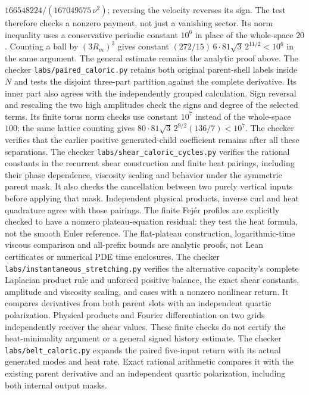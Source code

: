 \documentclass[11pt]{article}
\begin{document}
$166548224/(167049575\,\nu^2)$; reversing the velocity reverses its sign.
The test therefore checks a nonzero payment, not just a vanishing sector.
Its norm inequality uses a conservative periodic constant $10^6$ in
place of the whole-space $20$. Counting a ball by $(3R_m)^3$ gives
constant $(272/15)\,6\cdot81\sqrt3\,2^{11/2}<10^6$ in the same argument.
The general estimate remains the analytic proof above.
The checker \texttt{labs/paired\_caloric.py} retains both original
parent-shell labels inside $N$ and tests the disjoint three-part
partition against the complete derivative. Its inner part also agrees
with the independently grouped calculation. Sign reversal and rescaling
the two high amplitudes check the signs and degree of the selected
terms. Its finite torus norm checks use constant $10^7$ instead of
the whole-space $100$; the same lattice counting gives
$80\cdot81\sqrt3\,2^{9/2}(136/7)<10^7$.
The checker verifies that the earlier positive generated-child
coefficient remains after all these separations.
The checker \texttt{labs/shear\_caloric\_cycles.py} verifies the rational
constants in the recurrent shear construction and finite heat pairings,
including their phase dependence, viscosity scaling and behavior under
the symmetric parent mask. It also checks the cancellation between two
purely vertical inputs before applying that mask. Independent
physical products, inverse curl and heat quadrature agree with those
pairings. The finite Fej\'er profiles are explicitly checked to have a
nonzero plateau-equation residual: they test the heat formula, not the
smooth Euler reference. The flat-plateau construction, logarithmic-time
viscous comparison and all-prefix bounds are analytic proofs, not Lean
certificates or numerical PDE time enclosures.
The checker \texttt{labs/instantaneous\_stretching.py} verifies the
alternative capacity's complete Laplacian product rule and unforced
positive balance, the exact shear constants, amplitude and viscosity
scaling, and cases with a nonzero nonlinear return. It compares derivatives
from both parent slots with an independent quartic polarization. Physical
products and Fourier differentiation on two grids independently recover
the shear values. These finite checks do not certify the heat-minimality
argument or a general signed history estimate.
The checker \texttt{labs/belt\_caloric.py} expands the paired five-input
return with its actual generated modes and heat rate. Exact rational
arithmetic compares it with the existing parent derivative and an
independent quartic polarization, including both internal output masks.
\end{document}
